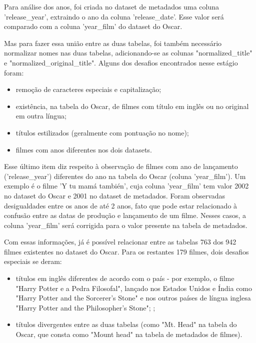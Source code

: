             Para análise dos anos, foi criada no dataset de metadados uma coluna 'release\_year', extraindo o ano da coluna 'release\_date'. Esse valor será comparado com a coluna 'year\_film' do dataset do Oscar.
            
            Mas para fazer essa união entre as duas tabelas, foi também necessário normalizar nomes nas duas tabelas, adicionando-se as colunas "normalized\_title" e "normalized\_original\_title". Alguns dos desafios encontrados nesse estágio foram:

            \begin{itemize}
                \item remoção de caracteres especiais e capitalização;
                \item existência, na tabela do Oscar, de filmes com título em inglês ou no original em outra língua;
                \item títulos estilizados (geralmente com pontuação no nome);
                \item filmes com anos diferentes nos dois datasets.
            \end{itemize}
            
            Esse último item diz respeito à observação de filmes com ano de lançamento ('release\_year') diferentes do ano na tabela do Oscar (coluna 'year\_film'). Um exemplo é o filme 'Y tu mamá también', cuja coluna 'year\_film' tem valor 2002 no dataset do Oscar e 2001 no dataset de metadados. Foram observadas desigualdades entre os anos de até 2 anos, fato que pode estar relacionado à confusão entre as datas de produção e lançamento de um filme. Nesses casos, a coluna 'year\_film' será corrigida para o valor presente na tabela de metadados.

            
            Com essas informações, já é possível relacionar entre as tabelas 763 dos 942 filmes existentes no dataset do Oscar. Para os restantes 179 filmes, dois desafios especiais se deram:\par
            
            \begin{itemize}
                \item títulos em inglês diferentes de acordo com o país - por exemplo, o filme "Harry Potter e a Pedra Filosofal", lançado nos Estados Unidos e Índia como "Harry Potter and the Sorcerer's Stone" e nos outros países de língua inglesa "Harry Potter and the Philosopher's Stone"; \cite{yahoo2000};\par
                \item títulos divergentes entre as duas tabelas (como "Mt. Head" na tabela do Oscar, que consta como "Mount head" na tabela de metadados de filmes).\par
            \end{itemize}
            
